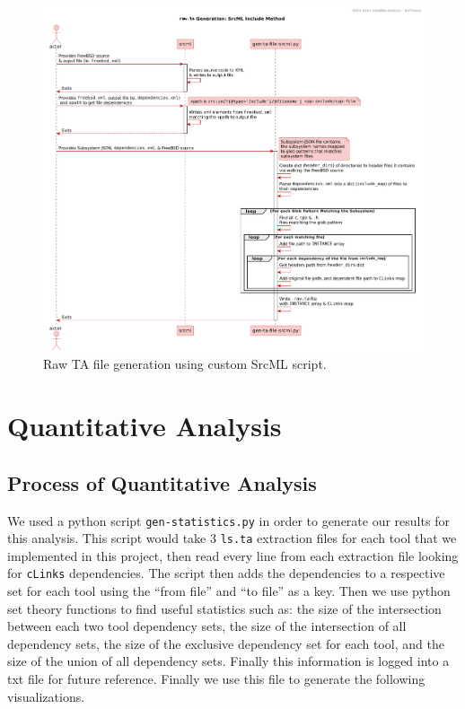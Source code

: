 \documentclass[12pt, dvipsnames, a4paper]{article}
\newcommand{\code}[1]{\texttt{#1}}
\begin{document}
\begin{figure}[!htb]
	\center
	\includegraphics[width = 450pt]{assets/sequence_diagrams/srcml_includes.pdf}
	\caption{Raw TA file generation using custom SrcML script.\cite{sourcecode}\cite{srcml}}
\end{figure}

\section{Quantitative Analysis}
\subsection{Process of Quantitative Analysis}

We used a python script \code{gen-statistics.py} in order to generate our results for this analysis. This script would take 3 \code{ls.ta} extraction files for each tool that we implemented in this project, then read every line from each extraction file looking for \code{cLinks} dependencies. The script then adds the dependencies to a respective set for each tool using the “from file” and “to file” as a key. Then we use python set theory functions to find useful statistics such as: the size of the intersection between each two tool dependency sets, the size of the intersection of all dependency sets, the size of the exclusive dependency set for each tool, and the size of the union of all dependency sets. Finally this information is logged into a txt file for future reference. Finally we use this file to generate the following visualizations.
\end{document}
